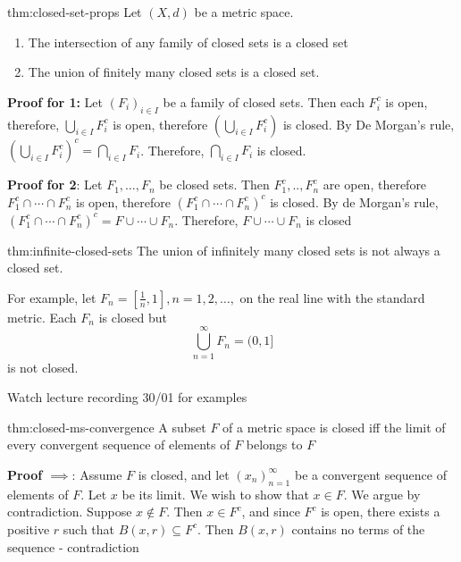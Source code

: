 \documentclass[landscape, 8pt]{extarticle}
\begin{document}
\begin{multicols}{3}
\begin{thm}{thm:closed-set-props}{}
    Let $(X, d)$ be a metric space.
    \begin{enumerate}
        \item The intersection of any family of closed sets is a closed set
        \item The union of finitely many closed sets is a closed set.
    \end{enumerate}
\end{thm}

\textbf{Proof for 1:} Let $(F_{i})_{i\in I}$ be a family of closed sets. Then each $F_{i}^{c}$ is open, therefore, $\displaystyle\bigcup_{i\in I} F^{c}_{i}$ is open, therefore $\displaystyle\left(\bigcup_{i\in I} F^{c}_{i}\right)$ is closed. By De Morgan's rule, $\displaystyle\left(\bigcup_{i\in I} F^{c}_{i}\right)^{c} = \bigcap_{i\in I} F_{i}$. Therefore, $\displaystyle\bigcap_{i\in I} F_{i}$ is closed.

\textbf{Proof for 2}: Let $F_{1},\dots, F_{n}$ be closed sets. Then $F^{c}_{1},..,F^{c}_{n}$ are open, therefore $F^{c}_{1} \cap \cdots \cap F^{c}_{n}$ is open, therefore $(F^{c}_{1} \cap \cdots \cap F^{c}_{n})^{c}$ is closed. By de Morgan's rule, $(F^{c}_{1}\cap \cdots\cap F^{c}_{n})^{c} = F \cup \cdots \cup F_{n}$. Therefore, $F \cup \cdots \cup F_{n}$ is closed

\begin{thm}{thm:infinite-closed-sets}{}
    The union of infinitely many closed sets is not always a closed set.

    For example, let $F_{n} = [\frac{1}{n}, 1], n=1,2,\dots,$ on the real line with the standard metric.
    Each $F_{n}$ is closed but
    \[\bigcup\limits_{n = 1}^{\infty}F_{n} = (0,1]\]
    is not closed.
\end{thm}

Watch lecture recording 30/01 for examples


\begin{thm}[]{thm:closed-ms-convergence}{}
    A subset $F$ of a metric space is closed iff the limit of every convergent sequence of elements of $F$ belongs to $F$
\end{thm}

\textbf{Proof $\implies$}: Assume $F$ is closed, and let $(x_{n})^{\infty}_{n=1}$ be a convergent sequence of elements of $F$. Let $x$ be its limit. We wish to show that $x\in F$. We argue by contradiction. Suppose $x\not\in F$. Then $x\in F^{c}$, and since $F^{c}$ is open, there exists a positive $r$ such that $B(x,r) \subseteq F^{c}$. Then $B(x,r)$ contains no terms of the sequence - contradiction


\end{multicols}
\end{document}
